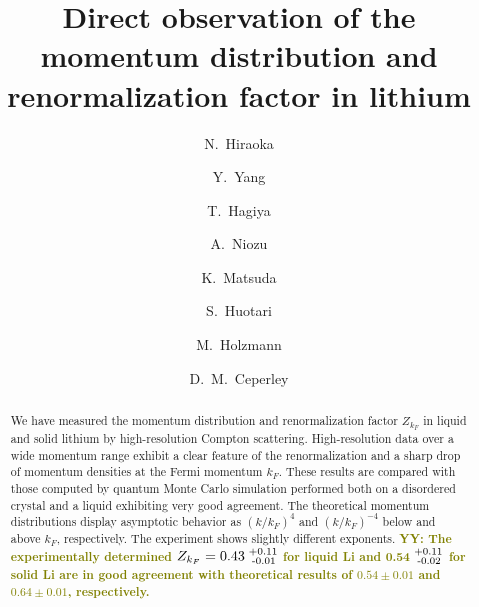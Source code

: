\documentclass[twocolumn,showpacs,showkeys,fleqn,prl,superscriptaddress]{revtex4}%
\newcommand{\nn}[1]{\textnormal{ #1}}
\newcommand{\yy}[1]{\textcolor{olive}{\textbf{YY: #1}}}
\begin{document}

\title{
Direct observation of the momentum distribution and renormalization factor in lithium
}

\author{ 
N.~Hiraoka
}

\author{ 
Y.~Yang
}

\author{ 
T.~Hagiya
}
  
\author{ 
A.~Niozu
}

\author{ 
K.~Matsuda
}

\author{ 
S.~Huotari
}


\author{ 
M.~Holzmann
}

\author{ 
D.~M.~Ceperley
}


\date{}
\begin{abstract}

We have measured the momentum distribution and renormalization factor $Z_{k_F}$ in liquid and solid lithium by high-resolution Compton scattering.
High-resolution data over a wide momentum range exhibit a clear feature of the renormalization and a sharp drop of momentum densities at the Fermi momentum $k_F$.
These results are compared with those computed by quantum Monte Carlo simulation performed both on a disordered crystal and a liquid exhibiting very good agreement.
The theoretical momentum distributions display asymptotic behavior as $(k/k_F)^4$ and $(k/k_F)^{-4}$ below and above $k_F$, respectively.
The experiment shows slightly different exponents.
\yy{The experimentally determined $Z_{k_F}=  0.43^{\nn{+0.11}}_{\nn{\;-0.01}}$ for liquid Li and 0.54$^{\nn{+0.11}}_{\nn{\;-0.02}}$ for solid Li are in good agreement with theoretical results of $0.54\pm0.01$ and $0.64\pm0.01$, respectively.}
\end{abstract}
\maketitle
\end{document}
